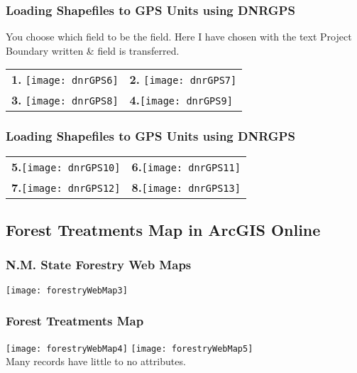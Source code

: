 \documentclass[t]{beamer} %
\begin{document}

\begin{frame}
\frametitle{Loading Shapefiles to GPS Units using DNRGPS}

You choose which field to be the  field. Here I have chosen  with the text Project Boundary written \&  field is transferred.
\begin{table}
\begin{tabular}{l l}
\textbf{1.} \texttt{[image: dnrGPS6]} & \textbf{2.} \texttt{[image: dnrGPS7]} \\
\textbf{3.} \texttt{[image: dnrGPS8]} & \textbf{4.}\texttt{[image: dnrGPS9]}
\end{tabular}
\end{table}
\end{frame}


\begin{frame}
\frametitle{Loading Shapefiles to GPS Units using DNRGPS}
\vspace{-0.2in}
\begin{table}
\begin{tabular}{l l}
\textbf{5.}\texttt{[image: dnrGPS10]} & \textbf{6.}\texttt{[image: dnrGPS11]}\\
\textbf{7.}\texttt{[image: dnrGPS12]} & \textbf{8.}\texttt{[image: dnrGPS13]}
\end{tabular}
\end{table}
\end{frame}


\subsection{Forest Treatments Map in ArcGIS Online}
\begin{frame}
\frametitle{N.M. State Forestry Web Maps}
\vspace{-0.35in}
\center
\texttt{[image: forestryWebMap3]}
\end{frame}


\begin{frame}
\frametitle{Forest Treatments Map}
\texttt{[image: forestryWebMap4]} 
\hfill\texttt{[image: forestryWebMap5]}\\
\center
\vspace{0.2in}
Many records have little to no attributes.
\end{frame}
\end{document}
